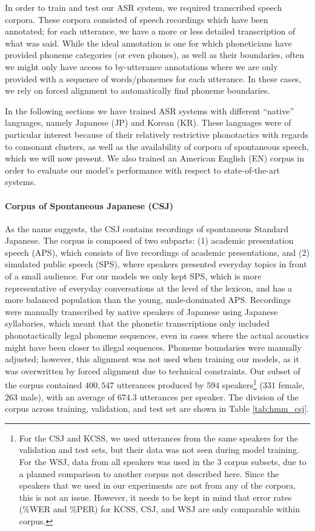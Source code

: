 In order to train and test our ASR system, we required transcribed speech corpora. These corpora consisted of speech recordings which have been annotated; for each utterance, we have a more or less detailed transcription of what was said.
While the ideal annotation is one for which phoneticians have provided phoneme categories (or even phones), as well as their boundaries, often we might only have access to by-utterance annotations where we are only provided with a sequence of words/phonemes for each utterance. In these cases, we rely on forced alignment to automatically find phoneme boundaries.

In the following sections we have trained ASR systems with different ``native'' languages, namely Japanese (JP) and Korean (KR). These languages were of particular interest because of their relatively restrictive phonotactics with regards to consonant clusters, as well as the availability of corpora of spontaneous speech, which we will now present. We also trained an American English (EN) corpus in order to evaluate our model's performance with respect to state-of-the-art systems. 

\paragraph{Corpus of Spontaneous Japanese (CSJ)}
As the name suggests, the CSJ \cite{maekawa2003} contains recordings of spontaneous Standard Japanese. The corpus is composed of two subparts: (1) academic presentation speech (APS), which consists of live recordings of academic presentations, and (2) simulated public speech (SPS), where speakers presented everyday topics in front of a small audience. For our models we only kept SPS, which is more representative of everyday conversations at the level of the lexicon, and has a more balanced population than the young, male-dominated APS.
Recordings were manually transcribed by native speakers of Japanese using Japanese syllabaries, which meant that the phonetic transcriptions only included phonotactically legal phoneme sequences, even in cases where the actual acoustics might have been closer to illegal sequences. Phoneme boundaries were manually adjusted; however, this alignment was not used when training our models, as it was overwritten by forced alignment due to technical constraints.
Our subset of the corpus contained $400,547$ utterances produced by $594$ speakers\footnote{For the CSJ and KCSS, we used utterances from the same speakers for the validation and test sets, but their data was not seen during model training. For the WSJ, data from all speakers was used in the 3 corpus subsets, due to a planned comparison to another corpus not described here. Since the speakers that we used in our experiments are not from any of the corpora, this is not an issue. However, it needs to be kept in mind that error rates (\%WER and \%PER) for KCSS, CSJ, and WSJ are only comparable within corpus.} ($331$ female, $263$ male), with an average of $674.3$ utterances per speaker. The division of the corpus across training, validation, and test set are shown in Table \ref{tab:hmm_csj}.


